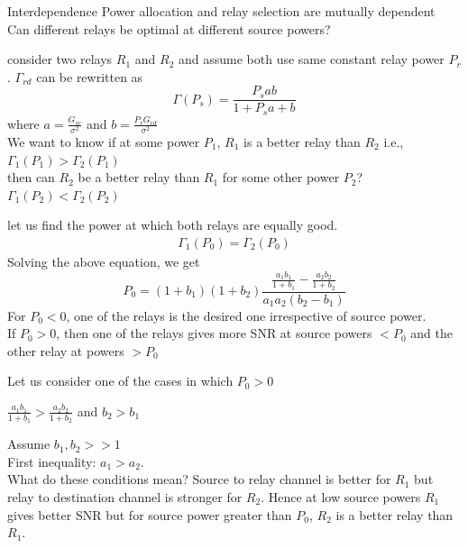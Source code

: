 \documentclass{beamer}
\begin{document}
\begin{frame}{Interdependence}
	\vspace{-1cm}
	Power allocation and relay selection are mutually dependent \\
	\vspace{1cm}
	\pause
	Can different relays be optimal at different
	source powers?
\end{frame}

\begin{frame}{}
consider two
relays $R_1$ and $R_2$ and assume both use same constant relay power $P_r$.
	$\Gamma_{rd}$ can be rewritten as
	\begin{equation*}
			\Gamma(P_s) = \frac{P_s ab}{1+P_s a + b} 
	\end{equation*}
	where $a = \frac{G_{sr}}{\sigma^2}$ and $b = \frac{P_{r} G_{r d}}{\sigma^2}$
\\
	We want to know if at some power $P_1$, $R_1$ is a better
	relay than $R_2$ i.e., \\ $\Gamma_1(P_1) > \Gamma_2(P_1)$ \\ then can $R_2$ be 
	a better relay than $R_1$ for some other power $P_2$? \\
	$\Gamma_1(P_2) < \Gamma_2(P_2)$
\end{frame}
\begin{frame}
let us find the power at which both relays are equally good.
	\begin{align*}
			\Gamma_1(P_0) = \Gamma_2(P_0)
	\end{align*}
	Solving the above equation, we get
	\begin{equation*}
			P_0 = (1+b_1)(1+b_2) \frac{\frac{a_1b_1}{1+b_1} - 
				\frac{a_2b_2}{1+b_2}}{a_1a_2(b_2-b_1)}
	\end{equation*}
	\pause
	For $P_0 < 0$, one of the relays is the desired one irrespective of source power.
\\
	\pause
	If $P_0 > 0$, then one of the relays gives more SNR at source
	powers $< P_0$ and the other relay at powers $ > P_0$ \\

\end{frame}
\begin{frame}
		Let us consider one of the cases in which $P_0 > 0$ \\
	\begin{center}
	$\frac{a_1b_1}{1+b_1} >	\frac{a_2b_2}{1+b_2}$ and $b_2 > b_1$
	\end{center}
	Assume $b_1,b_2 >> 1$ \\
	First inequality: $a_1 > a_2$. \\ 
	What do these conditions mean?
	Source to relay channel is 
	better for $R_1$ but relay to destination channel is stronger
	for $R_2$. Hence at low source powers $R_1$ gives
	better SNR but for  source power greater than  $P_0$, $R_2$ 
	is a better relay than $R_1$. 
	\\
\end{frame}
\end{document}
